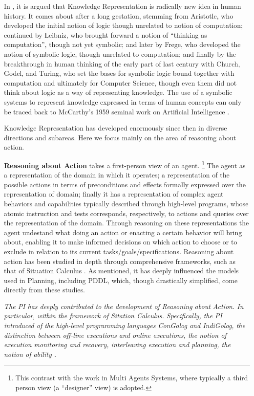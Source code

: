 In \cite{Levesque14,Levesque17}, it is argued that Knowledge Representation is
radically new idea in human history. It comes about after a long
gestation, stemming from Aristotle, who developed the initial notion
of logic though unrelated to notion of computation; continued by
Leibniz, who brought forward a notion of ``thinking as computation'',
though not yet symbolic; and later by Frege, who developed the notion
of symbolic logic, though unrelated to computation; and finally by the
breakthrough in human thinking of the early part of last century with
Church, Godel, and Turing, who set the bases for symbolic logic bound
together with computation and ultimately for Computer Science, though
even them did not think about logic as a way of representing
knowledge. The use of a symbolic systems to represent knowledge
expressed in terms of human concepts can only be traced back to
McCarthy's 1959 seminal work on Artificial Intelligence \cite{McCa57}.

Knowledge Representation has developed enormously since then in
diverse directions and subareas. Here we focus mainly on the area of reasoning about action.



\textbf{Reasoning about Action} takes a first-person view of an agent. %
\footnote{This contrast with the work in Multi Agents Systems, where
  typically a third person view (a ``designer'' view) is adopted.} %
The agent as a representation of the domain in which it operates;
a  representation of 
 the possible actions in terms of preconditions and effects formally expressed over the representation of domain;
finally it has a representation of  complex agent behaviors and capabilities typically  described through high-level programs, whose atomic instruction and tests corresponds, respectively, to actions and queries over the representation of the domain.
Through 
reasoning on these representations the agent undestand what doing an action or enacting a certain behavior will bring about, enabling it to make informed decisions on which action to choose or to exclude in relation to its current tasks/goals/specifications.
Reasoning about action has been studied in depth through
comprehensive frameworks, such as that of Situation Calculus \cite{McHa69,Reiter01}. 
As mentioned, it has deeply influenced the models used in Planning, including PDDL, which, though drastically simplified, come directly from these studies.


\emph{The PI has deeply contributed to the development of Reasoning about
Action. In particular, within the framework of Sitation Calculus. Specifically, the PI
introduced of the high-level programming languages
ConGolog and IndiGolog, the
distinction between off-line executions and online executions, the
notion of execution monitoring and recovery, interleaving execution
and planning, the notion of ability \cite{DeGiacomoRS98,DeGiacomoLL00,SardinaGLL04,SardinaGLL06}.}

